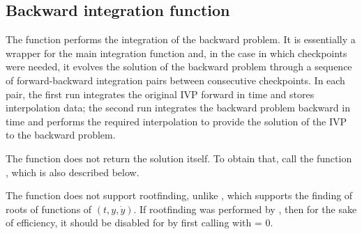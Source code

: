 \subsection{Backward integration function}
\label{sss:idasolveb}

The function  performs the integration of the backward problem.
It is essentially a wrapper for the {\idas} main integration function 
 and, in the case in which checkpoints were needed, it evolves 
the solution of the backward problem through a sequence of forward-backward 
integration pairs between consecutive checkpoints. 
In each pair, the first run integrates the original IVP forward in time and
stores interpolation data; the second run integrates the backward problem 
backward in time and performs the required interpolation to provide
the solution of the IVP to the backward problem.

The function  does not return the solution 
itself.  To obtain that, call the function , which is
also described below.

The  function does not support rootfinding, unlike
, which supports the finding of roots of functions of
$(t,y,\dot{y})$.  If rootfinding was performed by , then
for the sake of efficiency, it should be disabled for 
by first calling  with  = 0.

